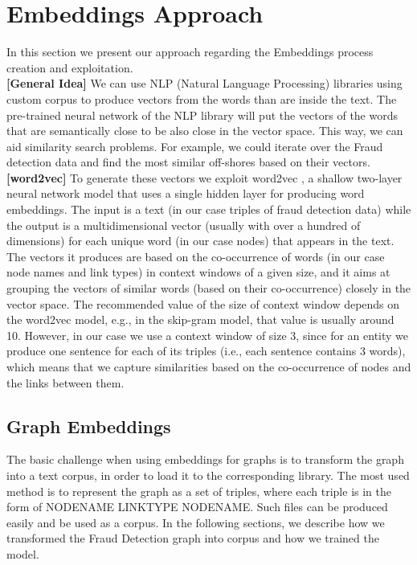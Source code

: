 \documentclass[sigconf, nonacm]{acmart}
\begin{document}
\section{Embeddings Approach}
In this section we present our approach regarding the Embeddings process creation and exploitation. \\
\textbf{[General Idea]} We can use NLP (Natural Language Processing) libraries using custom corpus to produce vectors from the words than are inside the text. The pre-trained neural network of the NLP library will put the vectors of the words that are semantically close to be also close in the vector space. This way, we can aid similarity search problems. For example, we could iterate over the Fraud detection data and find the most similar off-shores based on their vectors.\\
\textbf{[word2vec]} 
To generate these vectors we exploit word2vec \cite{word2vec}, a shallow two-layer neural network model that uses a single hidden layer for producing word embeddings. The input is a text (in our case triples of fraud detection data) while  the output is a multidimensional vector (usually with over a hundred of dimensions) for each unique word (in our case nodes) that appears in the text. The vectors it produces are based on the co-occurrence of words (in our case node names and link types) in context windows of a given size, and it aims at grouping the vectors of similar words (based on their co-occurrence) closely in the vector space. 
The recommended value of the size of context window depends on the word2vec model, e.g., in the skip-gram model, that value is usually around 10. However, in our case we use a context window of size 3, since for an entity we produce one sentence for each of its triples (i.e., each sentence contains 3 words), which means that we capture similarities based on the co-occurrence of nodes and the links between them.

\subsection{Graph Embeddings}
The basic challenge when using embeddings for graphs is to transform the graph into a text corpus, in order to load it to the corresponding library. The most used method is to represent the graph as a set of triples, where each triple is in the form of NODENAME LINKTYPE NODENAME. Such files can be produced easily and be used as a corpus. In the following sections, we describe how we transformed the Fraud Detection graph into corpus and how we trained the model.
\end{document}
